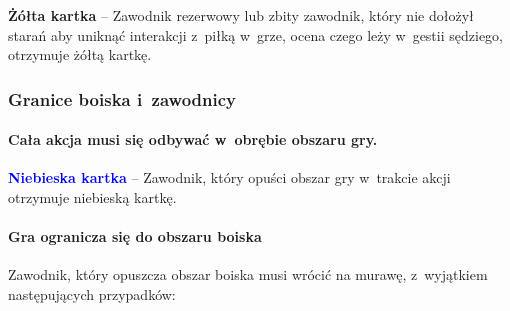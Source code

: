 \documentclass[12pt,a4paper]{article}
\newcommand\yellowcard[1]{\bgroup\textcolor{darkyellow}{\textbf{#1}}}
\newcommand\bluecard[1]{\bgroup\textcolor{blue}{\textbf{#1}}}
\begin{document}
\yellowcard{Żółta kartka} -- Zawodnik rezerwowy lub zbity zawodnik, który nie
dołożył starań aby uniknąć interakcji z~piłką w~grze, ocena czego leży w~gestii sędziego, otrzymuje żółtą kartkę.

\subsubsection{Granice boiska i~zawodnicy}

\paragraph{Cała akcja musi się odbywać w~obrębie obszaru gry.}

\bluecard{Niebieska kartka} -- Zawodnik, który opuści obszar gry w~trakcie
akcji otrzymuje niebieską kartkę.

\paragraph{Gra ogranicza się do obszaru boiska}
Zawodnik, który
opuszcza obszar boiska musi wrócić na murawę, z~wyjątkiem następujących
przypadków:
\end{document}

